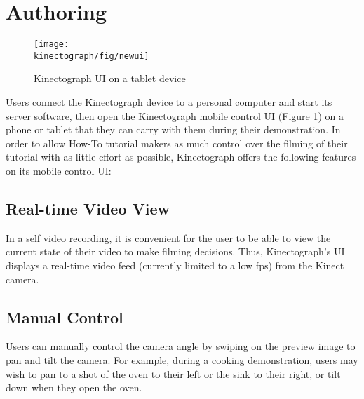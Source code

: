 \section{Authoring}

\begin{figure}[t]
\centering
\texttt{[image: \\kinectograph/fig/newui]}
\caption{Kinectograph UI on a tablet device}
\label{fig:figure4}
\end{figure}

Users connect the Kinectograph device to a personal computer and start its server software, then open the Kinectograph mobile control UI (Figure \ref{fig:figure4}) on a phone or tablet that they can carry with them during their demonstration.
%
In order to allow How-To tutorial makers as much control over the filming of their tutorial with as little effort as possible, Kinectograph offers the following features on its mobile control UI:

\subsection{Real-time Video View}
In a self video recording, it is convenient for the user to be able to view the current state of their video to make filming decisions. Thus, Kinectograph's UI displays a real-time video feed (currently limited to a low fps) from the Kinect camera.

\subsection{Manual Control}
Users can manually control the camera angle by swiping on the preview image to pan and tilt the camera. For example, during a cooking demonstration, users may wish to pan to a shot of the oven to their left or the sink to their right, or tilt down when they open the oven.

